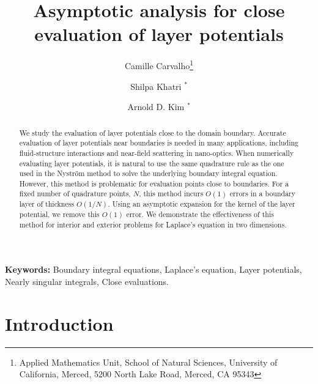 \documentclass{article}[12pt]
\numberwithin{equation}{section}
\begin{document}

  \title{Asymptotic analysis for close evaluation of layer potentials}
\author{Camille Carvalho\footnote{Applied Mathematics Unit, School of Natural Sciences,
    University of California, Merced, 5200 North Lake Road, Merced, CA
    95343}  \and  Shilpa Khatri ${}^{\ast}$  \and  Arnold D. Kim ${}^{\ast}$}
   \maketitle

  \begin{abstract}
    We study the evaluation of layer potentials close
      to the domain boundary. Accurate evaluation of layer potentials near boundaries
    is needed in many applications, including fluid-structure
    interactions and near-field scattering in nano-optics. 
    When numerically evaluating layer potentials, it is natural to use
    the same quadrature rule as the one used in the Nystr\"om method
    to solve the underlying boundary integral equation. However, this
    method is problematic for evaluation points close to
    boundaries. For a fixed number of quadrature points, $N$, this
    method incurs $O(1)$ errors in a boundary layer of thickness
    $O(1/N)$. Using an asymptotic expansion for the kernel of the
    layer potential, we remove this $O(1)$ error. We demonstrate the
    effectiveness of this method for interior and exterior problems
    for Laplace's equation in two dimensions.
  \end{abstract}

  \textbf{Keywords: }
    Boundary integral equations, Laplace's equation, Layer potentials,
    Nearly singular integrals, Close evaluations.\\

  

\section{Introduction}
\label{sec:intro}
\end{document}
